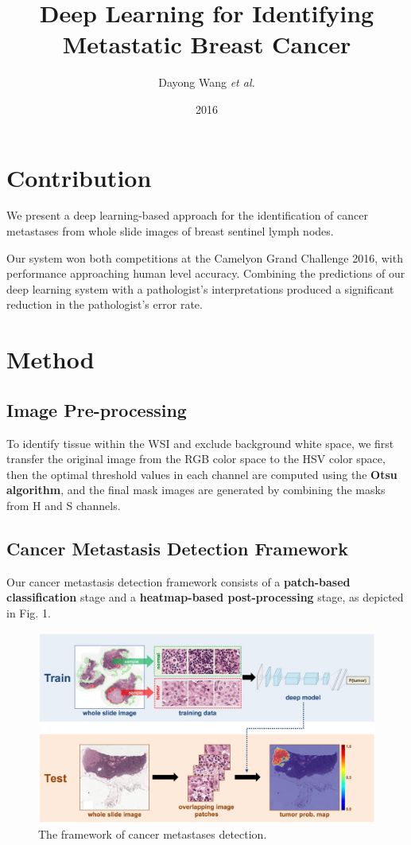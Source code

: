 \documentclass[a4paper,12pt]{article}
\title{Deep Learning for Identifying Metastatic Breast Cancer}
\author{Dayong Wang \emph{et al.}}
\date{2016}
\begin{document}
  \maketitle

\section{Contribution}

We present a deep learning-based approach for the identification of cancer metastases from whole slide images of breast sentinel lymph nodes.

Our system won both competitions at the Camelyon Grand Challenge 2016, with performance approaching human level accuracy. Combining the predictions of our deep learning system with a pathologist’s interpretations produced a significant reduction in the pathologist’s error rate.

\section{Method}

\subsection{Image Pre-processing}

To identify tissue within the WSI and exclude background white space, we first transfer the original image from the RGB color space to the HSV color space, then the optimal threshold values in each channel are computed using the \textbf{Otsu algorithm}, and the final mask images are generated by combining the masks from H and S channels.

\subsection{Cancer Metastasis Detection Framework}

Our cancer metastasis detection framework consists of a \textbf{patch-based classification} stage and a \textbf{heatmap-based post-processing} stage, as depicted in Fig. 1.

\begin{figure}[ht]
  \includegraphics[width=\columnwidth]{img/metastasis-framework.jpg}
  \caption{The framework of cancer metastases detection.}
\end{figure}
\end{document}
